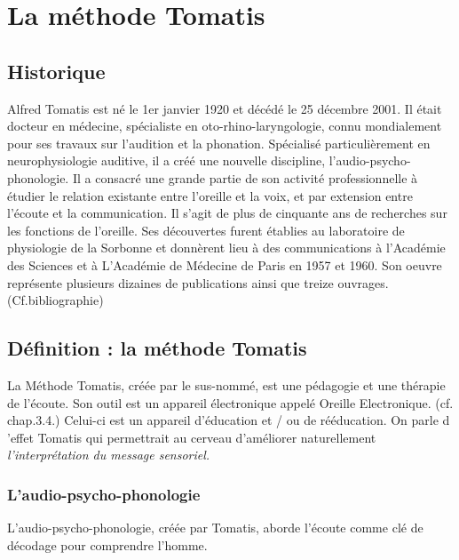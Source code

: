\chapter{La méthode Tomatis}


\section{Historique} 

Alfred Tomatis est né le 1er janvier 1920 et décédé le 25 décembre
2001. Il était docteur en médecine, spécialiste en oto-rhino-laryngologie,
connu mondialement pour ses travaux sur l'audition et la phonation.
Spécialisé particulièrement en neurophysiologie auditive, il a créé
une nouvelle discipline, l'audio-psycho-phonologie. Il a consacré
une grande partie de son activité professionnelle à étudier le relation
existante entre l'oreille et la voix, et par extension entre l'écoute
et la communication. Il s'agit de plus de cinquante ans de recherches
sur les fonctions de l'oreille. Ses découvertes furent établies au
laboratoire de physiologie de la Sorbonne et donnèrent lieu à des
communications à l'Académie des Sciences et à L'Académie de Médecine
de Paris en 1957 et 1960. Son oeuvre représente plusieurs dizaines
de publications ainsi que treize ouvrages. (Cf.bibliographie)

\section{Définition : la méthode Tomatis} %


La Méthode Tomatis, créée par le sus-nommé, est une pédagogie et une
thérapie de l'écoute. Son outil est un appareil électronique appelé
Oreille Electronique. 
(cf. chap.3.4.) %
Celui-ci est un appareil d'éducation
et / ou de rééducation. On parle d 'effet Tomatis qui permettrait au
cerveau d'améliorer naturellement \emph{l'interprétation du message
sensoriel.}

\subsection{L'audio-psycho-phonologie}

L'audio-psycho-phonologie, créée par Tomatis, aborde l'écoute comme
clé de décodage pour comprendre l'homme.

